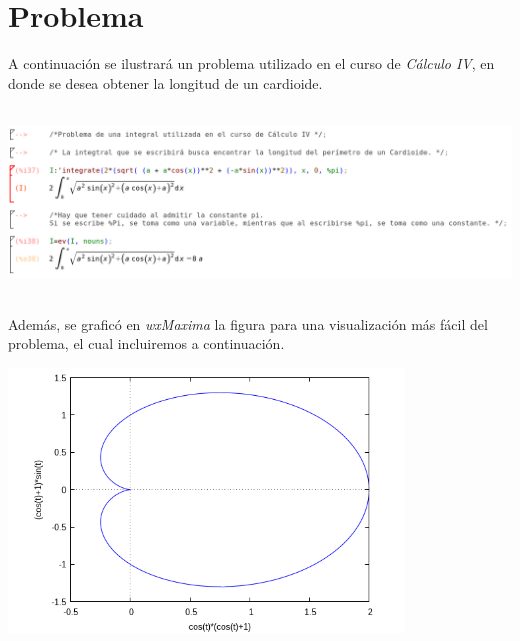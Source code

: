 \documentclass{article}
\begin{document}
\section{Problema}
A continuación se ilustrará un problema utilizado en el curso de \textit{Cálculo IV}, en donde se desea obtener la longitud de un cardioide. 

	\begin{center}
    \includegraphics[height=5cm]{Problema.png}
    \end{center}

Además, se graficó en \textit{wxMaxima} la figura para una visualización más fácil del problema, el cual incluiremos a continuación.

	\begin{center}
    \includegraphics[height=7cm]{cardioide.png}
    \end{center}
\end{document}
